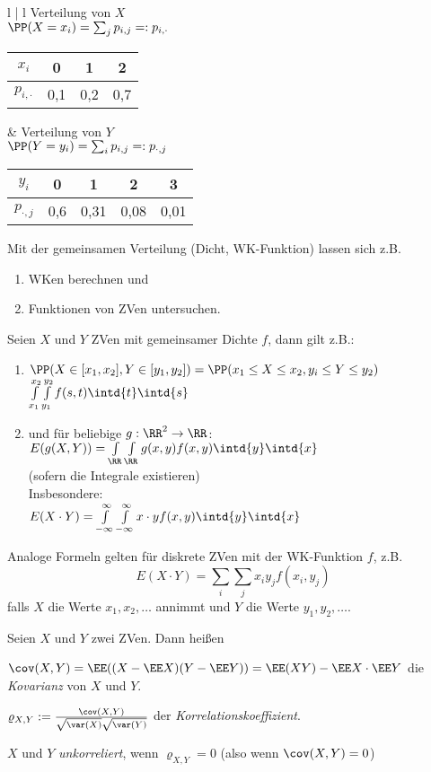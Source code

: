 \begin{itemize}
\begin{tabular}{l | l}
\mpb[.4]
Verteilung von $X$\\
$\PP(X=x_i)=\sum_j p_{i,j}=:p_{i,\cdot}$\\
\begin{tabular}{c | c c c}
$x_i$ & 0 & 1 & 2\\\hline
$p_{i,\cdot}$ & 0,1 & 0,2 & 0,7
\end{tabular}
\mpe &
\mpb[.4]
Verteilung von $Y$\\
$\PP(Y=y_i)=\sum_i p_{i,j}=:p_{\cdot,j}$\\
\begin{tabular}{c | c c c c}
$y_i$ & 0 & 1 & 2 & 3\\\hline
$p_{\cdot,j}$ & 0,6 & 0,31 & 0,08 & 0,01
\end{tabular}
\mpe
\end{tabular}
\end{itemize}

 Mit der gemeinsamen Verteilung (Dicht, WK-Funktion) lassen sich z.B.
\begin{enumerate}
\item WKen berechnen und
\item Funktionen von ZVen untersuchen.
\end{enumerate}
Seien $X$ und $Y$ ZVen mit gemeinsamer Dichte $f$, dann gilt z.B.:
\begin{enumerate}
\item $\PP(X\in [x_1, x_2], Y\in [y_1, y_2]) = \PP(x_1\leq X \leq x_2, y_i \leq Y \leq y_2)$\\
$\int\limits_{x_1}^{x_2}\int\limits_{y_1}^{y_2} f(s,t) \intd{t}\intd{s}$
\item und für beliebige $g: \RR^2 \to \RR$:\\
$E(g(X,Y)) = \int\limits_\RR\int\limits_\RR g(x,y) f(x,y) \intd{y}\intd{x}$\\
(sofern die Integrale existieren)\\
Insbesondere:\\
$E(X\cdot Y) = \int\limits_{-\infty}^{\infty}\int\limits_{-\infty}^{\infty}x\cdot y f(x,y) \intd{y}\intd{x}$
\end{enumerate}
Analoge Formeln gelten für diskrete ZVen mit der WK-Funktion $f$, z.B. 
$$E(X\cdot Y)=\sum_i \sum_j x_i y_j f(x_i, y_j)$$
falls $X$ die Werte $x_1, x_2, \dots$ annimmt und $Y$ die Werte $y_1, y_2, \dots$.

 Seien $X$ und $Y$ zwei ZVen. Dann heißen
\begin{anumerate}
\item $\cov(X,Y) = \EE((X-\EE X) ( Y - \EE Y)) = \EE (XY) - \EE X \cdot \EE Y$ die \emph{Kovarianz} von $X$ und $Y$.
\item $\varrho_{X,Y}:=\frac{\cov(X,Y)}{\sqrt{\var(X)}\sqrt{\var(Y)}}$ der \emph{Korrelationskoeffizient}.
\item $X$ und $Y$ \emph{unkorreliert}, wenn $\varrho_{X,Y}=0$ (also wenn $\cov(X,Y) = 0$)
\end{anumerate}

